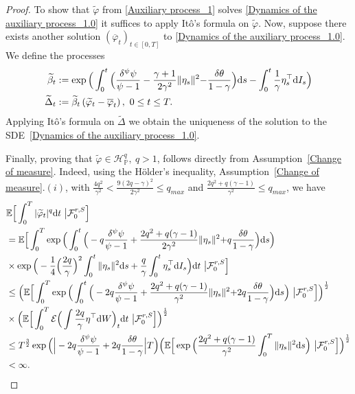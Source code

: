 \documentclass[12,reqno]{amsart}
\numberwithin{equation}{section}
\begin{document}
\begin{proof}
	To show that $\widetilde{\varphi}$ from \eqref{Auxiliary process_1} solves \eqref{Dynamics of the auxiliary process_1.0} it suffices to apply It{\^o}'s formula on $\widetilde{\varphi}$. Now, suppose there exists another solution $(\overline{\varphi}_{t})_{t\in[0,T]}$ to \eqref{Dynamics of the auxiliary process_1.0}. We define the processes
	\begin{align*}
		\widetilde{\beta}_{t}&:=\exp\Big(\int_{0}^{t}\Big(\frac{\delta^{\psi}\psi}{\psi-1}-\frac{\gamma+1}{2\gamma^{2}}\|\eta_{s}\|^{2}{-\frac{\delta\theta}{1-\gamma}}\Big)\mathrm{d}s -\int_{0}^{t}\frac{1}{\gamma}\eta_{s}^{\top}\mathrm{d}I_{s}\Big)\notag\\
		\widetilde{\Delta}_{t}&:=\widetilde{\beta}_{t}\left(\widetilde{\varphi}_{t}-\overline{\varphi}_{t}\right),~0\le t\le T.
	\end{align*}
	Applying It{\^o}'s formula on $\widetilde{\Delta}$ we obtain the uniqueness of the solution to the SDE~\eqref{Dynamics of the auxiliary process_1.0}.
	
	Finally, proving that $\widetilde{\varphi}\in\mathcal{H}_{\mathbb{P}}^{q},~q>1$, follows directly from Assumption~\ref{Change of measure}. Indeed, using the H{\"o}lder's inequality, Assumption~\ref{Change of measure}$.(i)$,  with $\frac{4q^{2}}{\gamma^{2}}<\frac{9(2q-\gamma)^{2}}{2\gamma^{2}}\le q_{max}$ and $\frac{2q^{2}+q(\gamma-1)}{\gamma^{2}}\le q_{max}$, we have
	\begin{align*}
		&\mathbb{E}\Big[\int_{0}^{T}|\widetilde{\varphi}_{t}|^{q}\mathrm{d}t~\big|\mathcal{F}_{0}^{r,S}\Big]\notag\\
		&=\mathbb{E}\Big[\int_{0}^{T}\exp\Big(\int_{0}^{t}\Big(-q\frac{\delta^{\psi}\psi}{\psi-1}+\frac{2q^{2}+q(\gamma-1)}{2\gamma^{2}}\|\eta_{s}\|^{2}{+q\frac{\delta\theta}{1-\gamma}}\Big)\mathrm{d}s\Big)\notag\\
		&\times\exp\Big(-\frac{1}{4}\Big(\frac{2q}{\gamma}\Big)^{2}\int_{0}^{t}\|\eta_{s}\|^{2}\mathrm{d}s+\frac{q}{\gamma}\int_{0}^{t}\eta_{s}^{\top}\mathrm{d}I_{s}\Big)\mathrm{d}t~\big|\mathcal{F}_{0}^{r,S}\Big]\notag\\
		&\le\Big(\mathbb{E}\Big[\int_{0}^{T}\exp\Big(\int_{0}^{t}\Big(-2q\frac{\delta^{\psi}\psi}{\psi-1}+\frac{2q^{2}+q(\gamma-1)}{\gamma^{2}}\|\eta_{s}\|^{2}{+2q\frac{\delta\theta}{1-\gamma}}\Big)\mathrm{d}s\Big)~\big|\mathcal{F}_{0}^{r,S}\Big]\Big)^{\frac{1}{2}}\notag\\
		&\times\Big(\mathbb{E}\Big[\int_{0}^{T}\mathcal{E}\Big(\int\frac{2q}{\gamma}\eta^{\top}\mathrm{d}W\Big)_{t}\mathrm{d}t~\big|\mathcal{F}_{0}^{r,S}\Big]\Big)^{\frac{1}{2}}\notag\\
		&\le T^{\frac{3}{2}}\exp\Big(\Big|-2q\frac{\delta^{\psi}\psi}{\psi-1}+2q\frac{\delta\theta}{1-\gamma}\Big|T\Big)\Big(\mathbb{E}\Big[\exp\Big(\frac{2q^{2}+q(\gamma-1)}{\gamma^{2}}\int_{0}^{T}\|\eta_{s}\|^{2}\mathrm{d}s\Big)~\big|\mathcal{F}_{0}^{r,S}\Big]\Big)^{\frac{1}{2}}\notag\\
		&<\infty.
	\end{align*}
	

\end{proof}
\end{document}
